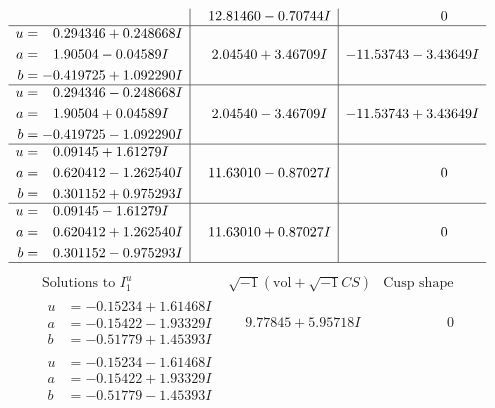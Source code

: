 \documentclass[1p]{elsarticle_modified}
\theoremstyle{definition}
\newcommand{\I}{\sqrt{-1}}
\begin{document}
$$\begin{array}{c|c|c}
 & \phantom{-}12.81460 - 0.70744 I & \phantom{-0.000000 } 0 \\ \hline\begin{aligned}
u &= \phantom{-}0.294346 + 0.248668 I \\
a &= \phantom{-}1.90504 - 0.04589 I \\
b &= -0.419725 + 1.092290 I\end{aligned}
 & \phantom{-}2.04540 + 3.46709 I & -11.53743 - 3.43649 I \\ \hline\begin{aligned}
u &= \phantom{-}0.294346 - 0.248668 I \\
a &= \phantom{-}1.90504 + 0.04589 I \\
b &= -0.419725 - 1.092290 I\end{aligned}
 & \phantom{-}2.04540 - 3.46709 I & -11.53743 + 3.43649 I \\ \hline\begin{aligned}
u &= \phantom{-}0.09145 + 1.61279 I \\
a &= \phantom{-}0.620412 - 1.262540 I \\
b &= \phantom{-}0.301152 + 0.975293 I\end{aligned}
 & \phantom{-}11.63010 - 0.87027 I & \phantom{-0.000000 } 0 \\ \hline\begin{aligned}
u &= \phantom{-}0.09145 - 1.61279 I \\
a &= \phantom{-}0.620412 + 1.262540 I \\
b &= \phantom{-}0.301152 - 0.975293 I\end{aligned}
 & \phantom{-}11.63010 + 0.87027 I & \phantom{-0.000000 } 0\\
 \hline 
 \end{array}$$\newpage$$\begin{array}{c|c|c}  
\text{Solutions to }I^u_{1}& \I (\text{vol} + \sqrt{-1}CS) & \text{Cusp shape}\\
 \hline 
\begin{aligned}
u &= -0.15234 + 1.61468 I \\
a &= -0.15422 - 1.93329 I \\
b &= -0.51779 + 1.45393 I\end{aligned}
 & \phantom{-}9.77845 + 5.95718 I & \phantom{-0.000000 } 0 \\ \hline\begin{aligned}
u &= -0.15234 - 1.61468 I \\
a &= -0.15422 + 1.93329 I \\
b &= -0.51779 - 1.45393 I\end{aligned}

\end{array}$$
\end{document}
